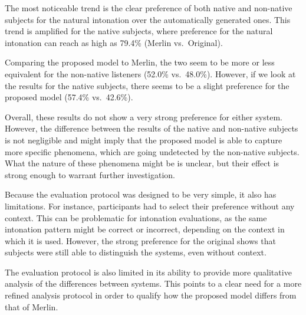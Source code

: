 The most noticeable trend is the clear preference of both native and non-native subjects for the natural intonation over the automatically generated ones.
This trend is amplified for the native subjects, where preference for the natural intonation can reach as high as 79.4\% (Merlin vs.\ Original).

Comparing the proposed model to Merlin, the two seem to be more or less equivalent for the non-native listeners (52.0\% vs.\ 48.0\%).
However, if we look at the results for the native subjects, there seems to be a slight preference for the proposed model (57.4\% vs.\ 42.6\%).

Overall, these results do not show a very strong preference for either system.
However, the difference between the results of the native and non-native subjects is not negligible and might imply that the proposed model is able to capture more specific phenomena, which are going undetected by the non-native subjects.
What the nature of these phenomena might be is unclear, but their effect is strong enough to warrant further investigation.

Because the evaluation protocol was designed to be very simple, it also has limitations.
For instance, participants had to select their preference without any context.
This can be problematic for intonation evaluations, as the same intonation pattern might be correct or incorrect, depending on the context in which it is used.
However, the strong preference for the original shows that subjects were still able to distinguish the systems, even without context.

The evaluation protocol is also limited in its ability to provide more qualitative analysis of the differences between systems.
This points to a clear need for a more refined analysis protocol in order to qualify how the proposed model differs from that of Merlin.

